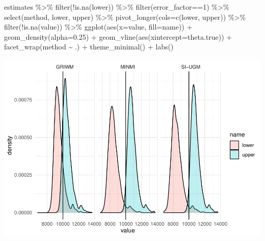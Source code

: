 \documentclass[
]{article}
\newenvironment{Shaded}{\begin{snugshade}}{\end{snugshade}}
\newcommand{\AttributeTok}[1]{\textcolor[rgb]{0.77,0.63,0.00}{#1}}
\newcommand{\DecValTok}[1]{\textcolor[rgb]{0.00,0.00,0.81}{#1}}
\newcommand{\FloatTok}[1]{\textcolor[rgb]{0.00,0.00,0.81}{#1}}
\newcommand{\FunctionTok}[1]{\textcolor[rgb]{0.00,0.00,0.00}{#1}}
\newcommand{\NormalTok}[1]{#1}
\newcommand{\SpecialCharTok}[1]{\textcolor[rgb]{0.00,0.00,0.00}{#1}}
\begin{document}
\begin{Shaded}
\begin{Highlighting}[]
\NormalTok{estimates }\SpecialCharTok{\%\textgreater{}\%}
  \FunctionTok{filter}\NormalTok{(}\SpecialCharTok{!}\FunctionTok{is.na}\NormalTok{(lower)) }\SpecialCharTok{\%\textgreater{}\%}
  \FunctionTok{filter}\NormalTok{(error\_factor}\SpecialCharTok{==}\DecValTok{1}\NormalTok{) }\SpecialCharTok{\%\textgreater{}\%}
  \FunctionTok{select}\NormalTok{(method, lower, upper) }\SpecialCharTok{\%\textgreater{}\%}
  \FunctionTok{pivot\_longer}\NormalTok{(}\AttributeTok{cols=}\FunctionTok{c}\NormalTok{(lower, upper)) }\SpecialCharTok{\%\textgreater{}\%}
  \FunctionTok{filter}\NormalTok{(}\SpecialCharTok{!}\FunctionTok{is.na}\NormalTok{(value)) }\SpecialCharTok{\%\textgreater{}\%}
  \FunctionTok{ggplot}\NormalTok{(}\FunctionTok{aes}\NormalTok{(}\AttributeTok{x=}\NormalTok{value, }\AttributeTok{fill=}\NormalTok{name)) }\SpecialCharTok{+}
  \FunctionTok{geom\_density}\NormalTok{(}\AttributeTok{alpha=}\FloatTok{0.25}\NormalTok{) }\SpecialCharTok{+}
  \FunctionTok{geom\_vline}\NormalTok{(}\FunctionTok{aes}\NormalTok{(}\AttributeTok{xintercept=}\NormalTok{theta.true)) }\SpecialCharTok{+}
  \FunctionTok{facet\_wrap}\NormalTok{(method }\SpecialCharTok{\textasciitilde{}}\NormalTok{ .) }\SpecialCharTok{+}
  \FunctionTok{theme\_minimal}\NormalTok{() }\SpecialCharTok{+}
  \FunctionTok{labs}\NormalTok{()}
\end{Highlighting}
\end{Shaded}

\includegraphics{sim_exp-results_files/figure-latex/unnamed-chunk-6-1.pdf}
\end{document}
